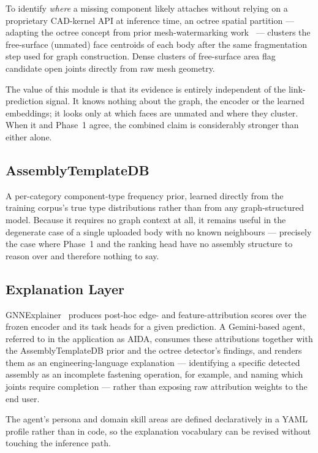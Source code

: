 \documentclass[12pt,oneside,a4paper]{report}
\begin{document}
To identify \emph{where} a missing component likely attaches without relying
on a proprietary CAD-kernel API at inference time, an octree spatial
partition --- adapting the octree concept from prior mesh-watermarking
work~\cite{borah2020watermark} --- clusters the free-surface (unmated) face
centroids of each body after the same fragmentation step used for graph
construction. Dense clusters of free-surface area flag candidate open joints
directly from raw mesh geometry.

The value of this module is that its evidence is entirely independent of the
link-prediction signal. It knows nothing about the graph, the encoder or the
learned embeddings; it looks only at which faces are unmated and where they
cluster. When it and Phase~1 agree, the combined claim is considerably
stronger than either alone.

\subsection{AssemblyTemplateDB}

A per-category component-type frequency prior, learned directly from the
training corpus's true type distributions rather than from any
graph-structured model. Because it requires no graph context at all, it
remains useful in the degenerate case of a single uploaded body with no known
neighbours --- precisely the case where Phase~1 and the ranking head have no
assembly structure to reason over and therefore nothing to say.

\subsection{Explanation Layer}
\label{sec:explainlayer}

GNNExplainer~\cite{ying2019gnnexplainer} produces post-hoc edge- and
feature-attribution scores over the frozen encoder and its task heads for a
given prediction. A Gemini-based agent, referred to in the application as
AIDA, consumes these attributions together with the AssemblyTemplateDB prior
and the octree detector's findings, and renders them as an
engineering-language explanation --- identifying a specific detected assembly
as an incomplete fastening operation, for example, and naming which joints
require completion --- rather than exposing raw attribution weights to the
end user.

The agent's persona and domain skill areas are defined declaratively in a
YAML profile rather than in code, so the explanation vocabulary can be
revised without touching the inference path.
\end{document}
